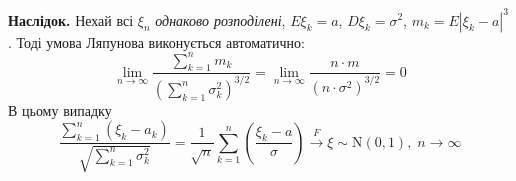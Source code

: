 \noindent\textbf{Наслідок.} Нехай всі $\xi_n$ \emph{однаково розподілені}, $E\xi_k = a$, $D\xi_k = \sigma^2$,
$m_k = E\left| \xi_k - a\right|^3$. Тоді умова Ляпунова виконується автоматично:
$$\underset{n \rightarrow \infty}{\lim} \frac{\sum\limits_{k=1}^n m_k}{\left(
    \sum\limits_{k=1}^n \sigma_k^2
\right)^{3/2}} = \underset{n \rightarrow \infty}{\lim} \frac{n \cdot m}{(n\cdot \sigma^2)^{3/2}} = 0$$
В цьому випадку
$$\frac{\sum\limits_{k=1}^n (\xi_k - a_k)}
{\sqrt{\sum\limits_{k=1}^n \sigma_k^2}}
= \frac{1}{\sqrt{n}} \sum\limits_{k=1}^n \left( \frac{\xi_k - a}{\sigma}\right) \overset{F}{\longrightarrow}\xi \sim \mathrm{N}(0, 1),
\;n \to \infty$$